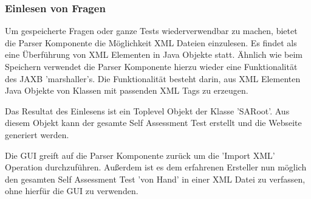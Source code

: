 \subsubsection{Einlesen von Fragen}
Um gespeicherte Fragen oder ganze Tests wiederverwendbar zu machen, bietet die Parser Komponente die Möglichkeit XML Dateien einzulesen.
Es findet als eine Überführung von XML Elementen in Java Objekte statt. Ähnlich wie beim Speichern verwendet die Parser Komponente hierzu wieder eine Funktionalität des JAXB 'marshaller's.
Die Funktionalität besteht darin, aus XML Elementen Java Objekte von Klassen mit passenden XML Tags zu erzeugen.

Das Resultat des Einlesens ist ein Toplevel Objekt der Klasse 'SARoot'. 
Aus diesem Objekt kann der gesamte Self Assessment Test erstellt und die Webseite generiert werden. 

Die GUI greift auf die Parser Komponente zurück um die 'Import XML' Operation durchzuführen. 
Außerdem ist es dem erfahrenen Ersteller nun möglich den gesamten Self Assessment Test 'von Hand' in einer XML Datei zu verfassen, ohne hierfür die GUI zu verwenden. 



